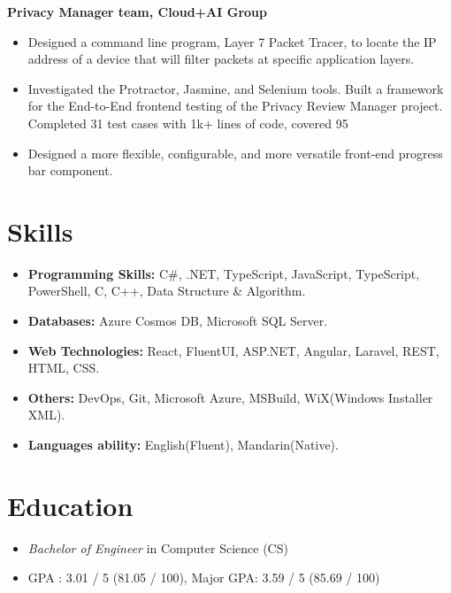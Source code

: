 \documentclass{resume}
\begin{document}
\textbf{Privacy Manager team, Cloud+AI Group}
\begin{itemize}
  \item Designed a command line program, Layer 7 Packet Tracer, to locate the IP address of a device that will filter packets at specific application layers.
  \item Investigated the Protractor, Jasmine, and Selenium tools. Built a framework for the End-to-End frontend testing of the Privacy Review Manager project. Completed 31 test cases with 1k+ lines of code, covered 95%
  \item Designed a more flexible, configurable, and more versatile front-end progress bar component.
\end{itemize}

\section{Skills}
\begin{itemize}[parsep=0.5ex]
  \item \textbf{Programming Skills:} C#, .NET, TypeScript, JavaScript, TypeScript, PowerShell, C, C++, Data Structure & Algorithm. 
  \item \textbf{Databases:} Azure Cosmos DB, Microsoft SQL Server.
  \item \textbf{Web Technologies:} React, FluentUI, ASP.NET, Angular, Laravel, REST, HTML, CSS.
  \item \textbf{Others:} DevOps, Git, Microsoft Azure, MSBuild, WiX(Windows Installer XML).
  \item \textbf{Languages ability:} English(Fluent), Mandarin(Native).
\end{itemize}

\section{Education}
\begin{itemize}
  \item \textit{Bachelor of Engineer} in Computer Science (CS)
  \item GPA : 3.01 / 5 (81.05 / 100), Major GPA: 3.59 / 5 (85.69 / 100)
\end{itemize}

%
%
\end{document}
